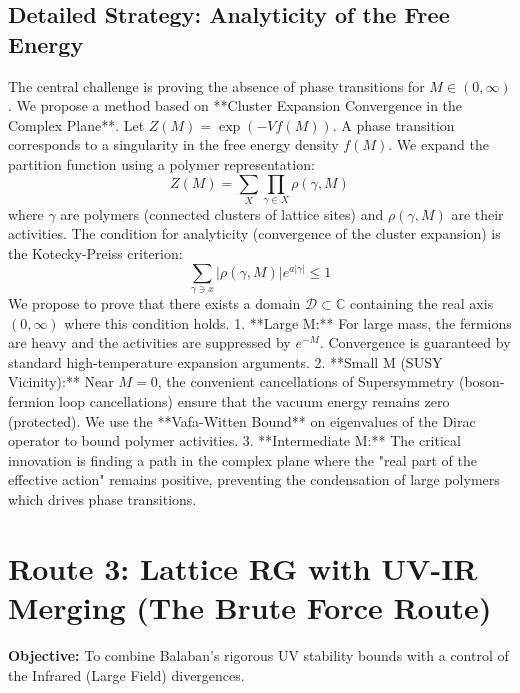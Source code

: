 \subsection{Detailed Strategy: Analyticity of the Free Energy}
The central challenge is proving the absence of phase transitions for $M \in (0, \infty)$. We propose a method based on **Cluster Expansion Convergence in the Complex Plane**.
Let $Z(M) = \exp(-V f(M))$. A phase transition corresponds to a singularity in the free energy density $f(M)$.
We expand the partition function using a polymer representation:
\begin{equation}
Z(M) = \sum_{X} \prod_{\gamma \in X} \rho(\gamma, M)
\end{equation}
where $\gamma$ are polymers (connected clusters of lattice sites) and $\rho(\gamma, M)$ are their activities.
The condition for analyticity (convergence of the cluster expansion) is the Kotecky-Preiss criterion:
\begin{equation}
\sum_{\gamma \ni x} |\rho(\gamma, M)| e^{a |\gamma|} \le 1
\end{equation}
We propose to prove that there exists a domain $\mathcal{D} \subset \mathbb{C}$ containing the real axis $(0, \infty)$ where this condition holds.
1. **Large M:** For large mass, the fermions are heavy and the activities are suppressed by $e^{-M}$. Convergence is guaranteed by standard high-temperature expansion arguments.
2. **Small M (SUSY Vicinity):** Near $M=0$, the convenient cancellations of Supersymmetry (boson-fermion loop cancellations) ensure that the vacuum energy remains zero (protected). We use the **Vafa-Witten Bound** on eigenvalues of the Dirac operator to bound polymer activities.
3. **Intermediate M:** The critical innovation is finding a path in the complex plane where the "real part of the effective action" remains positive, preventing the condensation of large polymers which drives phase transitions.

\section{Route 3: Lattice RG with UV-IR Merging (The Brute Force Route)}
\label{sec:lattice_rg_route}

\textbf{Objective:} To combine Balaban's rigorous UV stability bounds with a control of the Infrared (Large Field) divergences.

